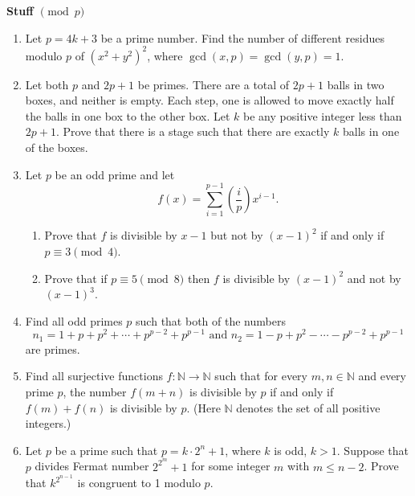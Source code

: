 \documentclass[12pt]{article}
\begin{document}
\pagestyle{fancy}
\setlength{\headheight}{15.2pt}




{\bfseries \Large Stuff $\pmod p$}


\begin{enumerate}

\item Let $p=4k+3$ be a prime number.  Find the number of different
  residues modulo $p$ of $(x^2+y^2)^2$, where $\gcd (x,p)=\gcd(y,p)=1$.

\item Let both $p$ and $2p+1$ be primes.  There are a total of $2p+1$
  balls in two boxes, and neither is empty.  Each step, one is allowed
  to move exactly half the balls in one box to the other box.  Let $k$
  be any positive integer less than $2p+1$.  Prove that there is a
  stage such that there are exactly $k$ balls in one of the boxes.
\item Let $p$ be an odd prime and let \[f(x) =
  \sum_{i=1}^{p-1}\left(\frac
  ip\right)x^{i-1}.\]  \begin{enumerate} \item Prove that $f$ is
    divisible by $x-1$ but not by $(x-1)^2$ if and only if $p\equiv
    3\pmod 4$. \item Prove that if $p\equiv 5\pmod 8$ then $f$ is
    divisible by $(x-1)^2$ and not by $(x-1)^3$.
\end{enumerate}

\item Find all odd primes $p$ such that both of the
  numbers \[n_1=1+p+p^2+\cdots+p^{p-2}+p^{p-1}\textrm{ and }
  n_2=1-p+p^2-\cdots-p^{p-2}+p^{p-1}\] are primes.

\item Find all surjective functions $f:\mathbb N\rightarrow\mathbb N$
  such that for every $m,n\in\mathbb N$ and every prime $p$, the
  number $f(m+n)$ is divisible by $p$ if and only if $f(m)+f(n)$ is
  divisible by $p$.  (Here $\mathbb N$ denotes the set of all positive integers.)

\item Let $p$ be a prime such that $p=k\cdot 2^n+1$, where $k$ is odd,
  $k>1$.  Suppose that $p$ divides Fermat number $2^{2^m}+1$ for some
  integer $m$ with $m\leq n-2$.  Prove that $k^{2^{n-1}}$ is congruent
    to 1 modulo $p$.


\end{enumerate}
\end{document}
